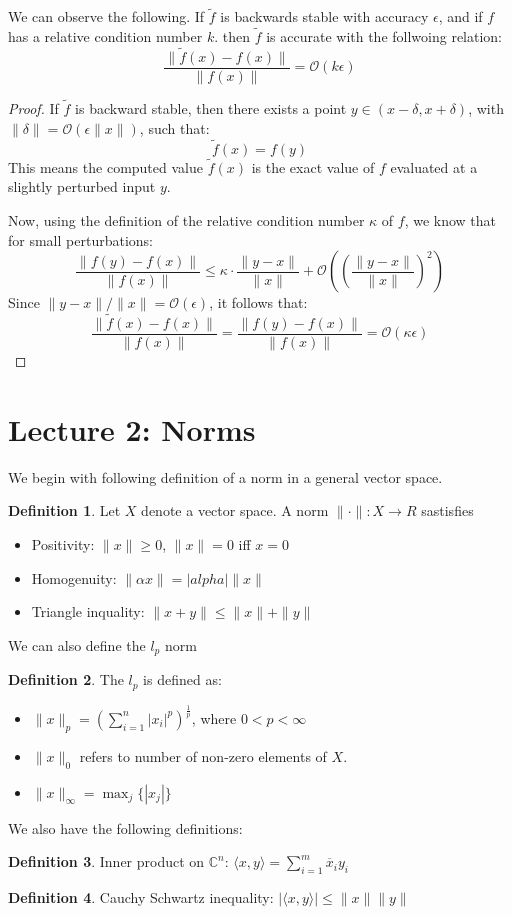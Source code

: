 \documentclass[11pt]{article}
\theoremstyle{definition}
\newtheorem{definition}{Definition}[section]
\newcommand{\C}{\mathbb{C}}
\begin{document}
We can observe the following. If $\tilde{f}$ is backwards stable with accuracy $\epsilon$, and if $f$ has a relative condition number $k$. then $\tilde{f}$ is accurate with the follwoing relation:
\[
\frac{\| \tilde{f}(x) - f(x) \|}{\|f(x)\|} = \mathcal{O}(k \epsilon)
\]
\begin{proof}

  If \( \tilde{f} \) is backward stable, then there exists a point \( y \in (x - \delta, x + \delta) \), with \( \|\delta\| = \mathcal{O}(\epsilon \|x\|) \), such that:
  \[
  \tilde{f}(x) = f(y)
  \]
  This means the computed value \( \tilde{f}(x) \) is the exact value of \( f \) evaluated at a slightly perturbed input \( y \).
  
  Now, using the definition of the relative condition number \( \kappa \) of \( f \), we know that for small perturbations:
  \[
  \frac{\|f(y) - f(x)\|}{\|f(x)\|} \leq \kappa \cdot \frac{\|y - x\|}{\|x\|} + \mathcal{O}\left(\left(\frac{\|y - x\|}{\|x\|}\right)^2\right)
  \]
  Since \( \|y - x\| / \|x\| = \mathcal{O}(\epsilon) \), it follows that:
  \[
  \frac{\|\tilde{f}(x) - f(x)\|}{\|f(x)\|} 
  = \frac{\|f(y) - f(x)\|}{\|f(x)\|} 
  = \mathcal{O}(\kappa \epsilon)
  \]
\end{proof}
\section{Lecture 2: Norms}
We begin with following definition of a norm in a general vector space. 
\begin{definition}
  Let $X$ denote a vector space. A norm $\| \cdot \| : X \to R$ sastisfies
  \begin{itemize}
    \item Positivity: $\| x\| \geq 0$, $\| x \| = 0$ iff $x = 0$
    \item Homogenuity: $\| \alpha x \| = |alpha| \| x \|$ 
    \item Triangle inquality: $\| x + y \| \leq \| x \| + \| y \|$
  \end{itemize}
\end{definition}
We can also define the $l_p$ norm
\begin{definition}
  The $l_p$ is defined as:
  \begin{itemize}
    \item $\| x\|_p = \left( \sum_{i = 1}^{n} |x_i|^p \right)^\frac{1}{p}$, where $0 < p < \infty$
    \item $\|x \|_0$ refers to number of non-zero elements of $X$. 
    \item $\| x \|_\infty = \max_j \{ |x_j| \}$
  \end{itemize}
\end{definition}
We also have the following definitions: 
\begin{definition}
  Inner product on $\C^n$: $\langle x, y \rangle = \sum_{i = 1}^{m} \overline{x}_i y_i$
\end{definition}
\begin{definition}
  Cauchy Schwartz inequality: $| \langle x, y \rangle | \leq \|x \| \|y \|$
\end{definition}
\end{document}
